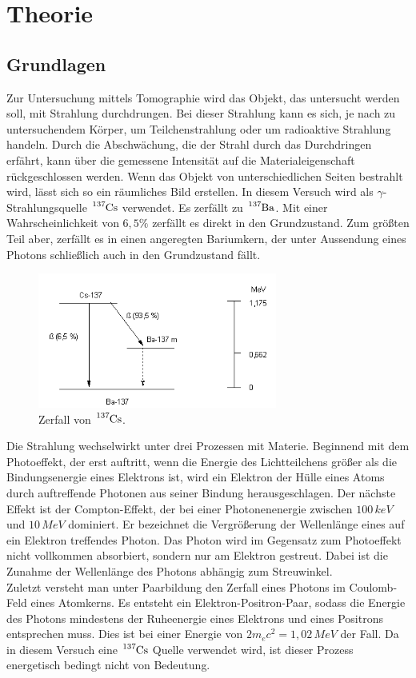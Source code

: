 \section{Theorie}
\subsection{Grundlagen}
Zur Untersuchung mittels Tomographie wird das Objekt, das untersucht werden soll, mit Strahlung durchdrungen.
Bei dieser Strahlung kann es sich, je nach zu untersuchendem Körper, um Teilchenstrahlung oder um radioaktive Strahlung handeln.
Durch die Abschwächung, die der Strahl durch das Durchdringen erfährt, kann über die gemessene Intensität auf die Materialeigenschaft rückgeschlossen werden.
Wenn das Objekt von unterschiedlichen Seiten bestrahlt wird, lässt sich so ein räumliches Bild erstellen.
In diesem Versuch wird als $\gamma$-Strahlungsquelle $\ce{^{137}Cs}$ verwendet. Es zerfällt zu $\ce{^{137}Ba}$.
Mit einer Wahrscheinlichkeit von $6,5 \%$ zerfällt es direkt in den Grundzustand.
Zum größten Teil aber, zerfällt es in einen angeregten Bariumkern, der unter Aussendung eines Photons schließlich auch in den Grundzustand fällt.

\begin{figure}[H]
  \centering
  \includegraphics[width=0.7\textwidth]{Bilder/caesium.png}
  \caption{Zerfall von $\ce{^{137}Cs}$.\cite{caesium}}
  \label{fig:caesium}
\end{figure}

Die Strahlung wechselwirkt unter drei Prozessen mit Materie.
Beginnend mit dem Photoeffekt, der erst auftritt, wenn die Energie des Lichtteilchens größer als die Bindungsenergie eines Elektrons ist, wird ein Elektron der Hülle eines
Atoms durch auftreffende Photonen aus seiner Bindung herausgeschlagen.
Der nächste Effekt ist der Compton-Effekt, der bei einer Photonenenergie zwischen $100\, \si{keV}$ und $10\, \si{MeV}$ dominiert.
Er bezeichnet die Vergrößerung der Wellenlänge eines auf ein Elektron treffendes Photon.
Das Photon wird im Gegensatz zum Photoeffekt nicht vollkommen absorbiert, sondern nur am Elektron gestreut. Dabei ist die Zunahme der Wellenlänge des Photons
abhängig zum Streuwinkel.\\
Zuletzt versteht man unter Paarbildung den Zerfall eines Photons im Coulomb-Feld eines Atomkerns.
Es entsteht ein Elektron-Positron-Paar, sodass die Energie des Photons mindestens der Ruheenergie eines Elektrons und eines Positrons entsprechen muss.
Dies ist bei einer Energie von $2m_ec^2 = 1,02\, \si{MeV}$ der Fall.
Da in diesem Versuch eine $\ce{^{137}Cs}$ Quelle verwendet wird, ist dieser Prozess energetisch bedingt nicht von Bedeutung.

